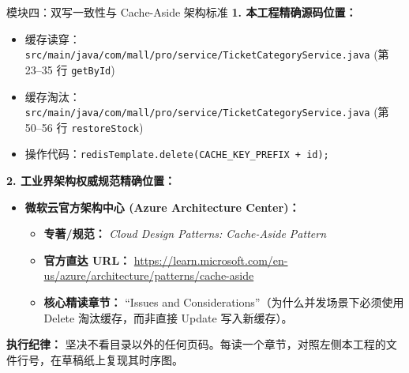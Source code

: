 \documentclass[a4paper,10pt]{ctexart}
\begin{document}
\vspace{0.2cm}

\begin{curriculumbox}{模块四：双写一致性与 Cache-Aside 架构标准}
\textbf{1. 本工程精确源码位置：}
\begin{itemize}[leftmargin=1.2cm, noitemsep]
    \item 缓存读穿：\texttt{src/main/java/com/mall/pro/service/TicketCategoryService.java} (第 23--35 行 \texttt{getById})
    \item 缓存淘汰：\texttt{src/main/java/com/mall/pro/service/TicketCategoryService.java} (第 50--56 行 \texttt{restoreStock})
    \item 操作代码：\texttt{redisTemplate.delete(CACHE\_KEY\_PREFIX + id);}
\end{itemize}

\textbf{2. 工业界架构权威规范精确位置：}
\begin{itemize}[leftmargin=1.2cm, noitemsep]
    \item \textbf{微软云官方架构中心 (Azure Architecture Center)：}
    \begin{itemize}
        \item \textbf{专著/规范：} \textit{Cloud Design Patterns: Cache-Aside Pattern}
        \item \textbf{官方直达 URL：} \url{https://learn.microsoft.com/en-us/azure/architecture/patterns/cache-aside}
        \item \textbf{核心精读章节：} ``Issues and Considerations''（为什么并发场景下必须使用 Delete 淘汰缓存，而非直接 Update 写入新缓存）。
    \end{itemize}
\end{itemize}
\end{curriculumbox}

\vspace{0.3cm}
\begin{center}
\textbf{执行纪律：} 坚决不看目录以外的任何页码。每读一个章节，对照左侧本工程的文件行号，在草稿纸上复现其时序图。
\end{center}
\end{document}

